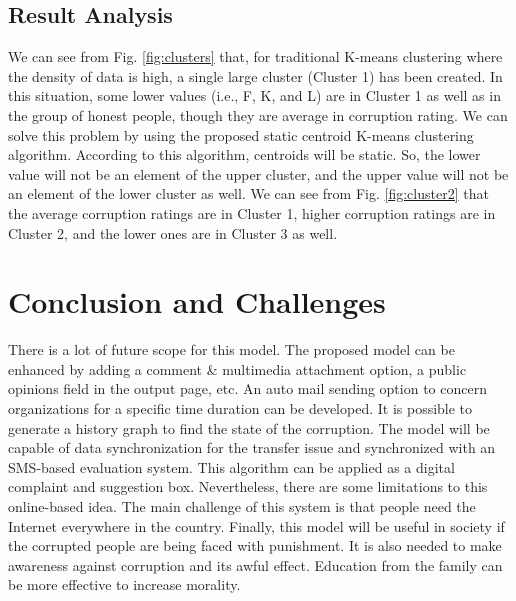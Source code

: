 \documentclass[conference]{IEEEtran}
\begin{document}
\subsection{Result Analysis}

We can see from Fig. \ref{fig:clusters} that, for traditional K-means clustering where the density of data is high, a single large cluster (Cluster 1) has been created. In this situation, some lower values (i.e., F, K, and L) are in Cluster 1 as well as in the group of honest people, though they are average in corruption rating. We can solve this problem by using the proposed static centroid K-means clustering algorithm. According to this algorithm, centroids will be static. So, the lower value will not be an element of the upper cluster, and the upper value will not be an element of the lower cluster as well. We can see from Fig. \ref{fig:cluster2} that the average corruption ratings are in Cluster 1, higher corruption ratings are in Cluster 2, and the lower ones are in Cluster 3 as well.

\section{Conclusion and Challenges}

There is a lot of future scope for this model. The proposed model can be enhanced by adding a comment \& multimedia attachment option, a public opinions field in the output page, etc. An auto mail sending option to concern organizations for a specific time duration can be developed. It is possible to generate a history graph to find the state of the corruption. The model will be capable of data synchronization for the transfer issue and synchronized with an SMS-based evaluation system. This algorithm can be applied as a digital complaint and suggestion box. Nevertheless, there are some limitations to this online-based idea. The main challenge of this system is that people need the Internet everywhere in the country. Finally, this model will be useful in society if the corrupted people are being faced with punishment. It is also needed to make awareness against corruption and its awful effect. Education from the family can be more effective to increase morality.



\end{document}
